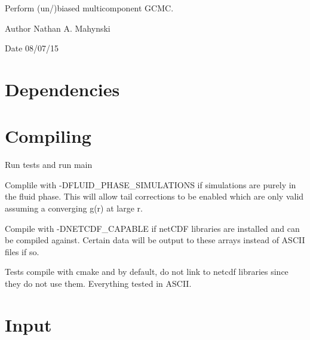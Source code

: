 Perform (un/)biased multicomponent G\-C\-M\-C.\begin{DoxyAuthor}{Author}
Nathan A. Mahynski 
\end{DoxyAuthor}
\begin{DoxyDate}{Date}
08/07/15
\end{DoxyDate}
\hypertarget{index_Dependencies}{}\section{Dependencies}\label{index_Dependencies}
\hypertarget{index_Compiling}{}\section{Compiling}\label{index_Compiling}
Run tests and run main

Complile with -\/\-D\-F\-L\-U\-I\-D\-\_\-\-P\-H\-A\-S\-E\-\_\-\-S\-I\-M\-U\-L\-A\-T\-I\-O\-N\-S if simulations are purely in the fluid phase. This will allow tail corrections to be enabled which are only valid assuming a converging g(r) at large r.

Compile with -\/\-D\-N\-E\-T\-C\-D\-F\-\_\-\-C\-A\-P\-A\-B\-L\-E if net\-C\-D\-F libraries are installed and can be compiled against. Certain data will be output to these arrays instead of A\-S\-C\-I\-I files if so.

Tests compile with cmake and by default, do not link to netcdf libraries since they do not use them. Everything tested in A\-S\-C\-I\-I.\hypertarget{main-tmmc.cpp_Input}{}\section{Input}\label{main-tmmc.cpp_Input}

